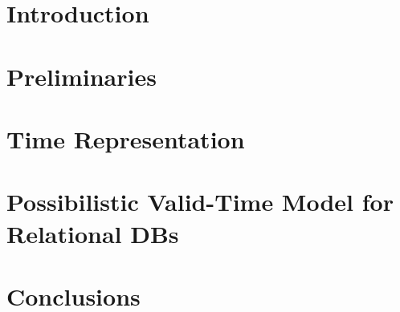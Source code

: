 \documentclass[11pt,twoside]{article}
\begin{document}
\vspace*{10pt}\textlineskip
\begin{multicols}{2}

\section{\label{sec:intro}Introduction}



\section{\label{sec:prelim}Preliminaries}


%
%

%

\section{\label{sec:time-rep}Time Representation}


\section{\label{sec:temporal-model}Possibilistic Valid-Time Model for Relational DBs}


%

\section{\label{sec:conclusions}Conclusions}



\end{multicols}
\end{document}
